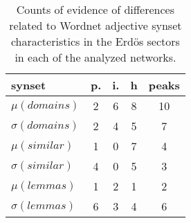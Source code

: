 \begin{table}[h!]
\begin{center}
\begin{tabular}{| l | c | c | c | c |}\hline
synset & p. & i. & h & peaks \\\hline
$\mu(domains)$ & 2  & 6  & 8  & 10 \\\hline
$\sigma(domains)$ & 2  & 4  & 5  & 7 \\\hline
$\mu(similar)$ & 1  & 0  & 7  & 4 \\\hline
$\sigma(similar)$ & 4  & 0  & 5  & 3 \\\hline
$\mu(lemmas)$ & 1  & 2  & 1  & 2 \\\hline
$\sigma(lemmas)$ & 6  & 3  & 4  & 6 \\\hline
\end{tabular}
\caption{Counts of evidence of differences related to Wordnet adjective synset characteristics in the Erd\"os sectors in each of the analyzed networks.}
\end{center}
\end{table}